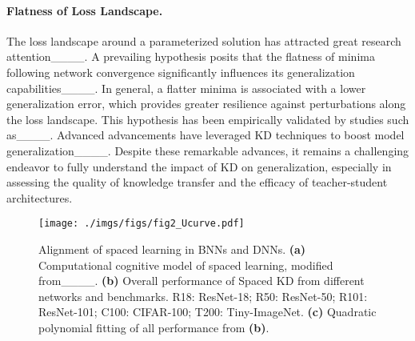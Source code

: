 
\vspace{-.5em}
\paragraph{Flatness of Loss Landscape.}
The loss landscape around a parameterized solution has attracted great research attention____. A prevailing hypothesis posits that the flatness of minima following network convergence significantly influences its generalization capabilities____. In general, a flatter minima is associated with a lower generalization error, which provides greater resilience against perturbations along the loss landscape. This hypothesis has been empirically validated by studies such as____. Advanced advancements have leveraged KD techniques to boost model generalization____. Despite these remarkable advances, it remains a challenging endeavor to fully understand the impact of KD on generalization, especially in assessing the quality of knowledge transfer and the efficacy of teacher-student architectures.

\iffalse
\begin{figure*}
    \centering
    \texttt{[image: ./imgs/figs/fig2\_Ucurve.pdf]}
    \vspace{-.2cm}
    \caption{Alignment of spaced learning in BNNs and DNNs. \textbf{(a)} Computational cognitive model of spaced learning, modified from____. \textbf{(b)} Overall performance of Spaced KD from different networks and benchmarks. R18: ResNet-18; R50: ResNet-50; R101: ResNet-101; C100: CIFAR-100; T200: Tiny-ImageNet. \textbf{(c)} Quadratic polynomial fitting of all performance from \textbf{(b)}. %
    }
    \label{fig:main_result}
     \vspace{-.3cm}
\end{figure*}
\vspace{-.5em}
